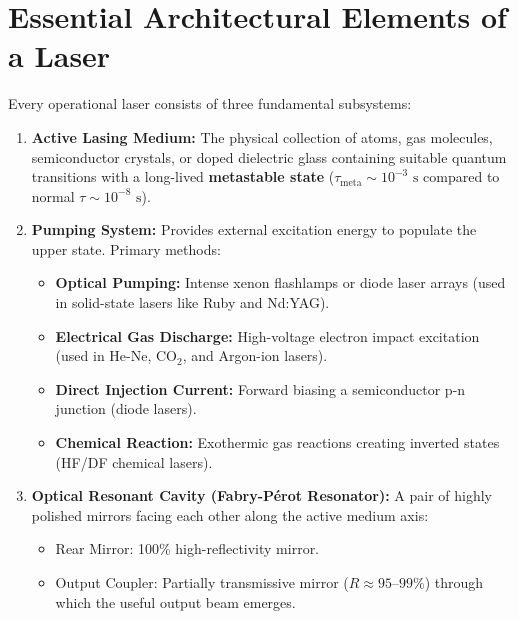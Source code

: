 \section{Essential Architectural Elements of a Laser}
Every operational laser consists of three fundamental subsystems:
\begin{enumerate}[leftmargin=*,itemsep=3pt]
    \item \textbf{Active Lasing Medium:} The physical collection of atoms, gas molecules, semiconductor crystals, or doped dielectric glass containing suitable quantum transitions with a long-lived \textbf{metastable state} ($\tau_{\text{meta}} \sim 10^{-3}\text{ s}$ compared to normal $\tau \sim 10^{-8}\text{ s}$).
    \item \textbf{Pumping System:} Provides external excitation energy to populate the upper state. Primary methods:
    \begin{itemize}
        \item \textbf{Optical Pumping:} Intense xenon flashlamps or diode laser arrays (used in solid-state lasers like Ruby and Nd:YAG).
        \item \textbf{Electrical Gas Discharge:} High-voltage electron impact excitation (used in He-Ne, $\text{CO}_2$, and Argon-ion lasers).
        \item \textbf{Direct Injection Current:} Forward biasing a semiconductor p-n junction (diode lasers).
        \item \textbf{Chemical Reaction:} Exothermic gas reactions creating inverted states (HF/DF chemical lasers).
    \end{itemize}
    \item \textbf{Optical Resonant Cavity (Fabry-Pérot Resonator):} A pair of highly polished mirrors facing each other along the active medium axis:
    \begin{itemize}
        \item Rear Mirror: 100\% high-reflectivity mirror.
        \item Output Coupler: Partially transmissive mirror ($R \approx 95\text{--}99\%$) through which the useful output beam emerges.
    \end{itemize}
\end{enumerate}

